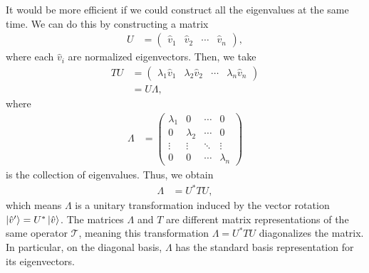 \documentclass[10pt]{mypackage}
\begin{document}
It would be more efficient if we could construct all the eigenvalues at the same time. We can do this by constructing a matrix
\begin{align*}
  U &= \begin{pmatrix} \hat{v}_1 & \hat{v}_2 & \cdots & \hat{v}_n\end{pmatrix},
\end{align*}
where each $\hat{v}_i$ are normalized eigenvectors. Then, we take
\begin{align*}
  TU &= \begin{pmatrix}\lambda_1\hat{v}_1 & \lambda_2\hat{v}_2 & \cdots & \lambda_n\hat{v}_n\end{pmatrix}\\
     &= U\Lambda,
\end{align*}
where
\begin{align*}
  \Lambda &= \begin{pmatrix}\lambda_1 & 0 & \cdots & 0 \\ 0 & \lambda_2 & \cdots & 0 \\ \vdots & \vdots & \ddots & \vdots \\ 0 & 0 & \cdots & \lambda_n\end{pmatrix}
\end{align*}
is the collection of eigenvalues. Thus, we obtain
\begin{align*}
  \Lambda &= U^{\ast}TU,
\end{align*}
which means $\Lambda$ is a unitary transformation induced by the vector rotation $\ket{\hat{v}'} = U^{\ast}\ket{\hat{v}}$. The matrices $\Lambda$ and $T$ are different matrix representations of the same operator $\mathcal{T}$, meaning this transformation $\Lambda = U^{\ast}TU$ diagonalizes the matrix. In particular, on the diagonal basis, $\Lambda$ has the standard basis representation for its eigenvectors.\newline
\end{document}
